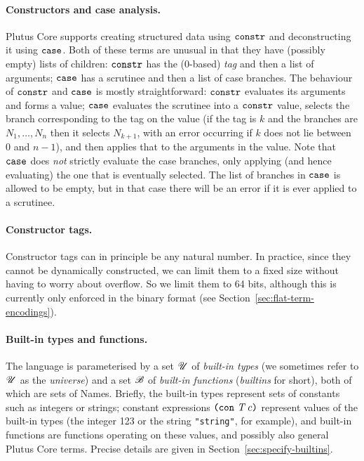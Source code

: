 \paragraph{Constructors and case analysis.}
Plutus Core supports creating structured data using $\texttt{constr}$ and
deconstructing it using $\texttt{case}$. Both of these terms are unusual in
that they have (possibly empty) lists of children: $\texttt{constr}$ has the
(0-based) \emph{tag} and then a list of arguments; $\texttt{case}$ has a
scrutinee and then a list of case branches. The behaviour of $\texttt{constr}$
and $\texttt{case}$ is mostly straightforward: $\texttt{constr}$ evaluates its
arguments and forms a value; $\texttt{case}$ evaluates the scrutinee into a
$\texttt{constr}$ value, selects the branch corresponding to the tag on the
value (if the tag is $k$ and the branches are $N_1, \ldots, N_n$ then it selects
$N_{k+1}$, with an error occurring if $k$ does not lie between 0 and $n-1$), and
then applies that to the arguments in the value. Note that $\texttt{case}$ does
\emph{not} strictly evaluate the case branches, only applying (and hence
evaluating) the one that is eventually selected.  The list of branches in
$\texttt{case}$ is allowed to be empty, but in that case there will be an error
if it is ever applied to a scrutinee.

\paragraph{Constructor tags.}
Constructor tags can in principle be any natural number. In practice, since they
cannot be dynamically constructed, we can limit them to a fixed size without
having to worry about overflow. So we limit them to 64 bits, although this is
currently only enforced in the binary format (see
Section~\ref{sec:flat-term-encodings}).

\paragraph{Built-in types and functions.} The language is parameterised by a set $\mathscr{U}$ of
\textit{built-in types} (we sometimes refer to $\mathscr{U}$ as the \textit{universe})
and a set $\mathscr{B}$ of \textit{built-in functions} (\textit{builtins} for short),
both of which are sets of Names.  Briefly, the built-in types represent sets of
constants such as integers or strings; constant expressions $\texttt{(} \texttt{con} ~ \textit{T} ~ c \texttt{)}$
represent values of the built-in types (the integer 123 or the string
\texttt{"string"}, for example), and built-in functions are functions operating
on these values, and possibly also general Plutus Core terms.  Precise details
are given in Section~\ref{sec:specify-builtins}.

